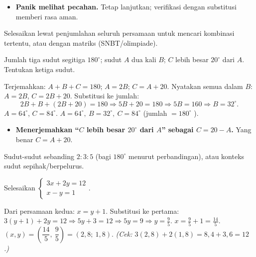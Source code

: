\begin{jebakan}
\begin{itemize}[leftmargin=*,topsep=2pt]
  \item \textbf{Panik melihat pecahan.} Tetap lanjutkan; verifikasi dengan
  substitusi memberi rasa aman.
\end{itemize}
\end{jebakan}

\begin{variasi}
Selesaikan lewat penjumlahan seluruh persamaan untuk mencari kombinasi tertentu,
atau dengan matriks (SNBT/olimpiade).
\end{variasi}

\begin{soalbox}{}
Jumlah tiga sudut segitiga $180^\circ$; sudut $A$ dua kali $B$; $C$ lebih besar
$20^\circ$ dari $A$. Tentukan ketiga sudut.
\end{soalbox}

\jawab
{} Terjemahkan: $A+B+C=180$; $A=2B$; $C=A+20$.
 Nyatakan semua dalam $B$: $A=2B$, $C=2B+20$.
 Substitusi ke jumlah:
\[
2B+B+(2B+20)=180\Rightarrow 5B+20=180\Rightarrow 5B=160\Rightarrow B=32^\circ.
\]
 $A=64^\circ$, $C=84^\circ$.
\jadi $A=64^\circ,\ B=32^\circ,\ C=84^\circ$ (jumlah $=180^\circ$ \checkmark).

\begin{jebakan}
\begin{itemize}[leftmargin=*,topsep=2pt]
  \item \textbf{Menerjemahkan ``$C$ lebih besar $20^\circ$ dari $A$'' sebagai
  $C=20-A$.} Yang benar $C=A+20$.
\end{itemize}
\end{jebakan}

\begin{variasi}
Sudut-sudut sebanding $2:3:5$ (bagi $180^\circ$ menurut perbandingan), atau
konteks sudut sepihak/berpelurus.
\end{variasi}

\begin{soalbox}{}
Selesaikan $\begin{cases} 3x+2y=12\\ x-y=1\end{cases}$.
\end{soalbox}

\jawab
{} Dari persamaan kedua: $x=y+1$.
 Substitusi ke pertama: $3(y+1)+2y=12\Rightarrow 5y+3=12\Rightarrow
5y=9\Rightarrow y=\frac95$.
 $x=\frac95+1=\frac{14}{5}$.
\jadi $\left(x,y\right)=\left(\dfrac{14}{5},\ \dfrac95\right)=(2{,}8;\ 1{,}8)$.
\emph{(Cek: $3(2{,}8)+2(1{,}8)=8{,}4+3{,}6=12$ \checkmark.)}

